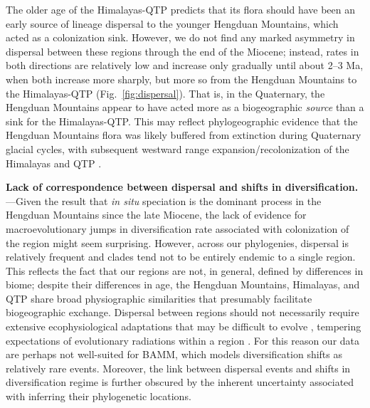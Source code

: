 
The older age of the Himalayas-QTP predicts that its flora should have been an early source of lineage dispersal to the younger Hengduan Mountains, which acted as a colonization sink. However, we do not find any marked asymmetry in dispersal between these regions through the end of the Miocene; instead, rates in both directions are relatively low and increase only gradually until about 2--3 Ma, when both increase more sharply, but more so from the Hengduan Mountains to the Himalayas-QTP (Fig.~\ref{fig:dispersal}). That is, in the Quaternary, the Hengduan Mountains appear to have acted more as a biogeographic \textit{source} than a sink for the Himalayas-QTP. This may reflect phylogeographic evidence that the Hengduan Mountains flora was likely buffered from extinction during Quaternary glacial cycles, with subsequent westward range expansion/recolonization of the Himalayas and QTP \citep[e.g.,][]{WangBS2011,CunY2010}. 


\textbf{Lack of correspondence between dispersal and shifts in diversification.}---Given the result that \textit{in situ} speciation is the dominant process in the Hengduan Mountains since the late Miocene, the lack of evidence for macroevolutionary jumps in diversification rate associated with colonization of the region might seem surprising. However, across our phylogenies, dispersal is relatively frequent and clades tend not to be entirely endemic to a single region. This reflects the fact that our regions are not, in general, defined by differences in biome; despite their differences in age, the Hengduan Mountains, Himalayas, and QTP share broad physiographic similarities that presumably facilitate biogeographic exchange. Dispersal between regions should not necessarily require extensive ecophysiological adaptations that may be difficult to evolve \citep{Donoghue2014}, tempering expectations of evolutionary radiations within a region \citep[cf.][]{Hughes2006}. For this reason our data are perhaps not well-suited for BAMM, which models diversification shifts as relatively rare events. Moreover, the link between dispersal events and shifts in diversification regime is further obscured by the inherent uncertainty associated with inferring their phylogenetic locations.

